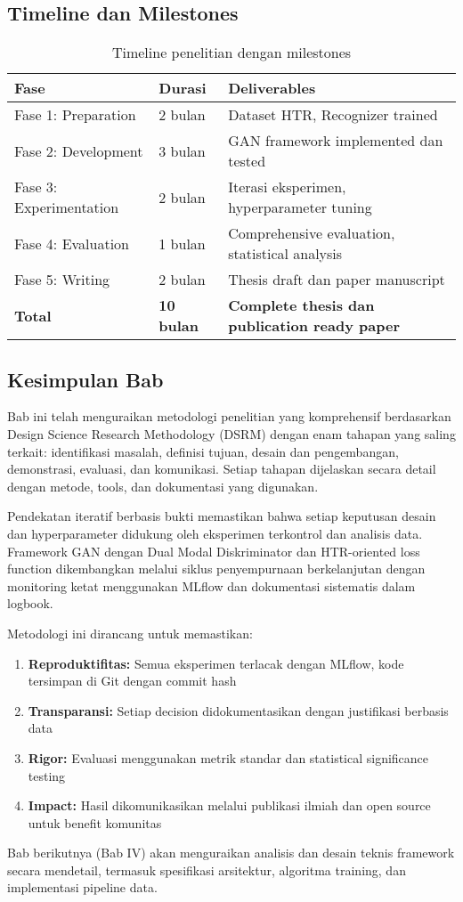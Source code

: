 \documentclass[12pt,a4paper]{article}
\begin{document}
\subsection{Timeline dan Milestones}
\label{subsec:timeline}

\begin{table}[H]
\centering
\caption{Timeline penelitian dengan milestones}
\label{tab:timeline}
\small
\begin{tabular}{|l|l|p{6cm}|}
\hline
\textbf{Fase} & \textbf{Durasi} & \textbf{Deliverables} \\ \hline
Fase 1: Preparation & 2 bulan & Dataset HTR, Recognizer trained \\ \hline
Fase 2: Development & 3 bulan & GAN framework implemented dan tested \\ \hline
Fase 3: Experimentation & 2 bulan & Iterasi eksperimen, hyperparameter tuning \\ \hline
Fase 4: Evaluation & 1 bulan & Comprehensive evaluation, statistical analysis \\ \hline
Fase 5: Writing & 2 bulan & Thesis draft dan paper manuscript \\ \hline
\textbf{Total} & \textbf{10 bulan} & \textbf{Complete thesis dan publication ready paper} \\ \hline
\end{tabular}
\end{table}

\subsection{Kesimpulan Bab}
\label{subsec:kesimpulan-bab}

Bab ini telah menguraikan metodologi penelitian yang komprehensif berdasarkan Design Science Research Methodology (DSRM) dengan enam tahapan yang saling terkait: identifikasi masalah, definisi tujuan, desain dan pengembangan, demonstrasi, evaluasi, dan komunikasi. Setiap tahapan dijelaskan secara detail dengan metode, tools, dan dokumentasi yang digunakan.

Pendekatan iteratif berbasis bukti memastikan bahwa setiap keputusan desain dan hyperparameter didukung oleh eksperimen terkontrol dan analisis data. Framework GAN dengan Dual Modal Diskriminator dan HTR-oriented loss function dikembangkan melalui siklus penyempurnaan berkelanjutan dengan monitoring ketat menggunakan MLflow dan dokumentasi sistematis dalam logbook.

Metodologi ini dirancang untuk memastikan:
\begin{enumerate}[leftmargin=*, nosep]
\item \textbf{Reproduktifitas:} Semua eksperimen terlacak dengan MLflow, kode tersimpan di Git dengan commit hash
\item \textbf{Transparansi:} Setiap decision didokumentasikan dengan justifikasi berbasis data
\item \textbf{Rigor:} Evaluasi menggunakan metrik standar dan statistical significance testing
\item \textbf{Impact:} Hasil dikomunikasikan melalui publikasi ilmiah dan open source untuk benefit komunitas
\end{enumerate}

Bab berikutnya (Bab IV) akan menguraikan analisis dan desain teknis framework secara mendetail, termasuk spesifikasi arsitektur, algoritma training, dan implementasi pipeline data.
\end{document}
